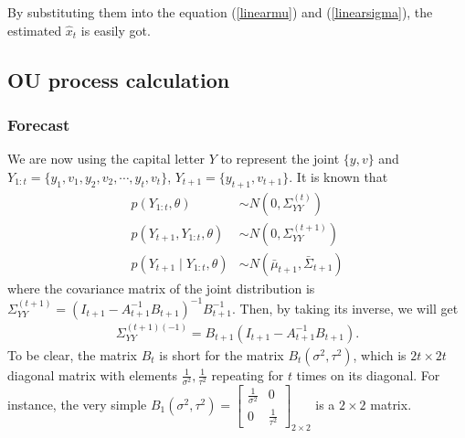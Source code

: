 By substituting them into the equation (\ref{linearmu}) and (\ref{linearsigma}), the estimated $\hat{x}_t$ is easily got. 






\subsection{OU process calculation}\label{OUcalculation}

\subsubsection*{Forecast}
We are now using the capital letter $Y$ to represent the joint $\{y,v\}$ and $Y_{1:t} = \{y_1,v_1,y_2,v_2,\cdots, y_t, v_t \}$, $Y_{t+1} = \{y_{t+1}, v_{t+1}\}$. It is known that 
\begin{align*}
p(Y_{1:t},\theta) &\sim N\left( 0,\Sigma_{YY}^{(t)} \right)\\
p(Y_{t+1},Y_{1:t},\theta) &\sim N\left( 0,\Sigma_{YY}^{(t+1)} \right)\\
p(Y_{t+1}\mid Y_{1:t},\theta) &\sim N\left( \bar{\mu}_{t+1},\bar{\Sigma}_{t+1} \right)
\end{align*}
where the covariance matrix of the joint distribution is $\Sigma_{YY}^{(t+1)} = (I_{t+1}-A_{t+1}^{-1}B_{t+1})^{-1}B_{t+1}^{-1}$. Then, by taking its inverse, we will get
\begin{align*}
\Sigma_{YY}^{(t+1) (-1)} = B_{t+1}(I_{t+1}-A_{t+1}^{-1}B_{t+1}).
\end{align*}
To be clear, the matrix $B_t$ is short for the matrix $B_t(\sigma^2,\tau^2)$, which is $2t\times 2t$ diagonal matrix with elements $\frac{1}{\sigma^2},\frac{1}{\tau^2}$ repeating for $t$ times on its diagonal. For instance, the very simple $B_1(\sigma^2,\tau^2) = 
\begin{bmatrix}
\frac{1}{\sigma^2} & 0  \\
0 & \frac{1}{\tau^2}
\end{bmatrix}_{2\times 2}$ is a $2\times 2$ matrix. 

